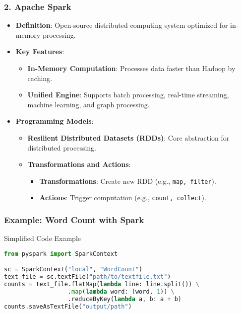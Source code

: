 \documentclass[aspectratio=169]{beamer}
\begin{document}
\begin{frame}[fragile]
    \frametitle{2. Apache Spark}
    \begin{itemize}
        \item \textbf{Definition}: Open-source distributed computing system optimized for in-memory processing.
        \item \textbf{Key Features}:
            \begin{itemize}
                \item \textbf{In-Memory Computation}: Processes data faster than Hadoop by caching.
                \item \textbf{Unified Engine}: Supports batch processing, real-time streaming, machine learning, and graph processing.
            \end{itemize}
        \item \textbf{Programming Models}:
            \begin{itemize}
                \item \textbf{Resilient Distributed Datasets (RDDs)}: Core abstraction for distributed processing.
                \item \textbf{Transformations and Actions}:
                    \begin{itemize}
                        \item \textbf{Transformations}: Create new RDD (e.g., \texttt{map, filter}).
                        \item \textbf{Actions}: Trigger computation (e.g., \texttt{count, collect}).
                    \end{itemize}
            \end{itemize}
    \end{itemize}
\end{frame}

\begin{frame}[fragile]
    \frametitle{Example: Word Count with Spark}
    \begin{block}{Simplified Code Example}
    \begin{lstlisting}[language=Python]
from pyspark import SparkContext

sc = SparkContext("local", "WordCount")
text_file = sc.textFile("path/to/textfile.txt")
counts = text_file.flatMap(lambda line: line.split()) \
                  .map(lambda word: (word, 1)) \
                  .reduceByKey(lambda a, b: a + b)
counts.saveAsTextFile("output/path")
    \end{lstlisting}
    \end{block}
\end{frame}
\end{document}
